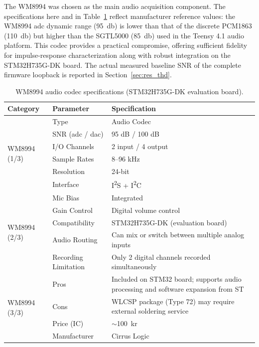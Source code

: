 The WM8994 was chosen as the main audio acquisition component. The specifications here and in Table~\ref{tab:wm8994_specs} reflect manufacturer reference values: the WM8994 \acrshort{adc} dynamic range (\SI{95}{\decibel}) is lower than that of the discrete PCM1863 (\SI{110}{\decibel}) but higher than the SGTL5000 (\SI{85}{\decibel}) used in the Teensy 4.1 audio platform. This codec provides a practical compromise, offering sufficient fidelity for impulse-response characterization along with robust integration on the STM32H735G-DK board. The actual measured baseline SNR of the complete firmware loopback is reported in Section~\ref{sec:res_thd}.


\begin{table}[h!]
\centering
\renewcommand{\arraystretch}{1.2}
\begin{tabular}{p{3cm} p{4.5cm} p{5cm}}
\hline
\textbf{Category} & \textbf{Parameter} & \textbf{Specification} \\
\hline
\multirow{6}{*}{WM8994 (1/3)}
& Type & Audio Codec \\
& SNR (\acrshort{adc} / \acrshort{dac}) & 95 dB / 100 dB \\
& I/O Channels & 2 input / 4 output \\
& Sample Rates & 8--96 kHz \\
& Resolution & 24-bit \\
& Interface & I\textsuperscript{2}S + I\textsuperscript{2}C \\
\hline
\multirow{5}{*}{WM8994 (2/3)}
& Mic Bias & Integrated \\
& Gain Control & Digital volume control \\
& Compatibility & STM32H735G-DK (evaluation board) \\
& Audio Routing & Can mix or switch between multiple analog inputs \\
& Recording Limitation & Only 2 digital channels recorded simultaneously \\
\hline
\multirow{4}{*}{WM8994 (3/3)}
& Pros & Included on STM32 board; supports audio processing and software expansion from ST \\
& Cons & WLCSP package (Type 72) may require external soldering service \\
& Price (IC) & $\sim$100~kr \\
& Manufacturer & Cirrus Logic \\
\hline
\end{tabular}
\caption{WM8994 audio codec specifications (STM32H735G-DK evaluation board).}
\label{tab:wm8994_specs}
\end{table}


